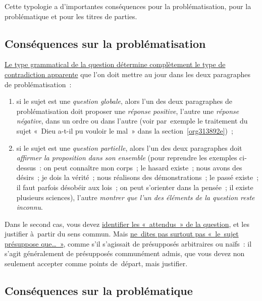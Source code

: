 \documentclass[a4paper,12pt]{report}
\begin{document}
Cette typologie a d'importantes conséquences pour la problématisation,
pour la problématique et pour les titres de parties.


\subsection{Conséquences sur la problématisation}
\label{sec:org9abd93a}

\uline{Le type grammatical de la question détermine complètement le type de
contradiction apparente} que l'on doit mettre au jour dans les deux
paragraphes de problématisation :

\begin{enumerate}
\item si le sujet est une \emph{question globale}, alors l'un des deux
paragraphes de problématisation doit proposer une \emph{réponse positive},
l'autre une \emph{réponse négative}, dans un ordre ou dans l'autre (voir
par exemple le traitement du sujet « Dieu a-t-il pu vouloir le mal »
dans la section \ref{org313892e}) ;

\item si le sujet est une \emph{question partielle}, alors l'un des deux
paragraphes doit \emph{affirmer la proposition dans son ensemble} (pour
reprendre les exemples ci-dessus : on peut connaître mon corps ; le
hasard existe ; nous avons des désirs ; je dois la vérité ; nous
réalisons des démonstrations ; le passé existe ; il faut parfois
désobéir aux lois ; on peut s'orienter dans la pensée ; il existe
plusieurs sciences), l'autre \emph{montrer que l'un des éléments de la
question reste inconnu}.
\end{enumerate}

Dans le second cas, vous devez \uline{identifier les « attendus » de la
question}, et les justifier à partir du sens commun. Mais \uline{ne dites pas
surtout pas « le sujet présuppose que\ldots{} »}, comme s'il s'agissait de
présupposés arbitraires ou naïfs : il s'agit généralement de présupposés
communément admis, que vous devez non seulement accepter comme points
de départ, mais justifier.


\subsection{Conséquences sur la problématique}
\label{sec:orga84d5e5}
\end{document}
